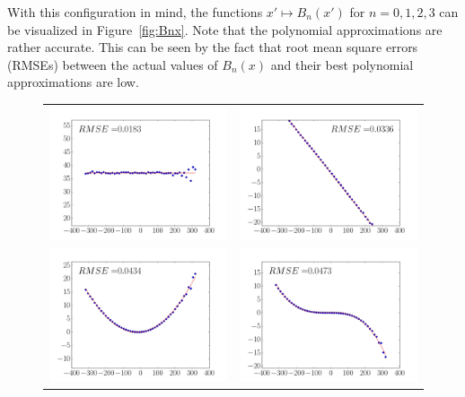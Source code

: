 \documentclass[9pt,technote]{IEEEtran}
\numberwithin{equation}{section}
\begin{document}
With this configuration in mind, the functions $x' \mapsto B_n(x')$ for $n = 0,1,2,3$ can be visualized in Figure~\ref{fig:Bnx}. Note that the polynomial approximations are rather accurate. This can be seen by the fact that root mean square errors (RMSEs) between the actual values of $B_n(x)$ and their best polynomial approximations are low.
\begin{figure}[!ht]
	\centering
	\begin{tabular}{cc}
	\includegraphics[width=85mm]{figs/B0.png} &
	\includegraphics[width=85mm]{figs/B1.png} \\
	\includegraphics[width=85mm]{figs/B2.png} &
	\includegraphics[width=85mm]{figs/B3.png} 

\end{tabular}
\end{figure}
\end{document}
